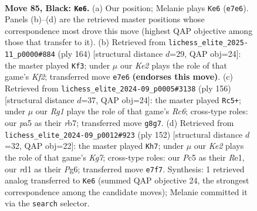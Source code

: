 \documentclass[11pt]{article}
\begin{document}
\clearpage

\begin{figure}[p]\centering
\begin{subfigure}{0.46\textwidth}\centering
\resizebox{\linewidth}{!}{%
\newchessgame
\chessboard[
  setfen={6r1/4k3/p7/Ppp2p1p/2p2P1P/4PKP1/1P6/3R4 b - - 16 85},
  showmover=false,
  pgfstyle=straightmove, color=movearrow, markmove={e7-e6}
]}
\caption{}
\end{subfigure}\hfill
\begin{subfigure}{0.46\textwidth}\centering
\resizebox{\linewidth}{!}{%
\newchessgame
\chessboard[
  setfen={4r3/1p6/p1p2kp1/P6p/1P3P1P/4P3/2R2K2/8 w - - 1 83},
  showmover=false,
  pgfstyle=straightmove, color=movearrow, markmove={f2-f3}
]}
\caption{}
\end{subfigure}
\\[4pt]
\begin{subfigure}{0.46\textwidth}\centering
\resizebox{\linewidth}{!}{%
\newchessgame
\chessboard[
  setfen={8/1r5p/2R3pP/4kpP1/4p3/4P3/5PK1/8 w - - 42 79},
  showmover=false,
  pgfstyle=straightmove, color=movearrow, markmove={c6-c5}
]}
\caption{}
\end{subfigure}\hfill
\begin{subfigure}{0.46\textwidth}\centering
\resizebox{\linewidth}{!}{%
\newchessgame
\chessboard[
  setfen={8/2pk2K1/1p1p2P1/p2P4/P1P5/1P3r2/8/4R3 w - - 14 77},
  showmover=false,
  pgfstyle=straightmove, color=movearrow, markmove={g7-h7}
]}
\caption{}
\end{subfigure}
\caption{\textbf{Move 85, Black: \texttt{Ke6}.} (a) Our position; Melanie plays \texttt{Ke6} (\texttt{e7e6}). Panels (b)--(d) are the retrieved master positions whose correspondence most drove this move (highest QAP objective among those that transfer to it). (b) Retrieved from \texttt{lichess\_elite\_2025-11\_p0000\#884} (ply 164) [structural distance $d$=29, QAP obj=24]: the master played \texttt{Kf3}; under $\mu$ our \emph{Ke2} plays the role of that game's \emph{Kf2}; transferred move \texttt{e7e6} \textbf{(endorses this move)}. (c) Retrieved from \texttt{lichess\_elite\_2024-09\_p0005\#3138} (ply 156) [structural distance $d$=37, QAP obj=24]: the master played \texttt{Rc5+}; under $\mu$ our \emph{Rg1} plays the role of that game's \emph{Rc6}; cross-type roles: our \emph{p}a5 as their \emph{r}b7; transferred move \texttt{g8g7}. (d) Retrieved from \texttt{lichess\_elite\_2024-09\_p0012\#923} (ply 152) [structural distance $d$=32, QAP obj=22]: the master played \texttt{Kh7}; under $\mu$ our \emph{Ke2} plays the role of that game's \emph{Kg7}; cross-type roles: our \emph{P}c5 as their \emph{R}e1, our \emph{r}d1 as their \emph{P}g6; transferred move \texttt{e7f7}. Synthesis: 1 retrieved analog transferred to \texttt{Ke6} (summed QAP objective 24, the strongest correspondence among the candidate moves); Melanie committed it via the \texttt{search} selector.}
\label{fig:thought-m169}
\end{figure}
\end{document}
